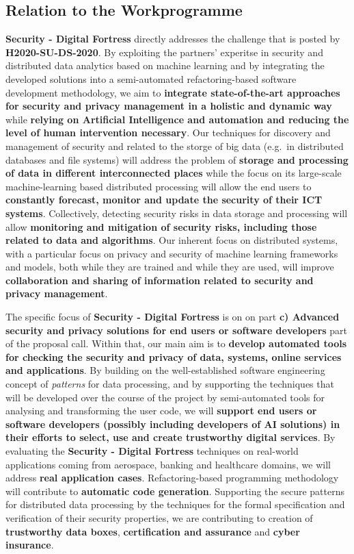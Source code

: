 \documentclass[a4paper,11pt]{article}
\newcommand{\project}[1]{\textbf{#1}\xspace}
\newcommand{\SECURITY}{\project{Security - Digital Fortress}}
\newcommand{\TheProject}{\SECURITY}
\begin{document}
\pagebreak
\subsection{Relation to the Workprogramme}

\TheProject{} directly addresses the challenge that is posted by \textbf{H2020-SU-DS-2020}. By exploiting the partners' experitse in security and distributed data analytics based on machine learning and by integrating the developed solutions into a semi-automated refactoring-based software development methodology, we aim to \textbf{integrate state-of-the-art approaches for security and privacy management in a holistic and dynamic way} while \textbf{relying on Artificial Intelligence and automation and reducing the level of human intervention necessary}. Our techniques for discovery and management of security and related to the storge of big data (e.g.~in distributed databases and file systems) will address the problem of \textbf{storage and processing of data in different interconnected places} while the focus on its large-scale machine-learning based distributed processing will allow the end users to \textbf{constantly forecast, monitor and update the security of their ICT systems}. Collectively, detecting security risks in data storage and processing will allow \textbf{monitoring and mitigation of security risks, including those related to data and algorithms}. Our inherent focus on distributed systems, with a particular focus on privacy and security of machine learning frameworks and models, both while they are trained and while they are used, will improve \textbf{collaboration and sharing of information related to security and privacy management}. 

The specific focus of \TheProject{} is on on part \textbf{c) Advanced security and privacy solutions for end users or software developers} part of the proposal call. Within that, our main aim is to \textbf{develop automated tools for checking the security and privacy of data, systems, online services and applications}. By building on the well-established software engineering concept of \emph{patterns} for data processing, and by supporting the techniques that will be developed over the course of the project by semi-automated tools for analysing and transforming the user code, we will \textbf{support end users or software developers (possibly including developers of AI solutions) in their efforts to select, use and create trustworthy digital services}. By evaluating the \TheProject{} techniques on real-world applications coming from aerospace, banking and healthcare domains, we will address \textbf{real application cases}. Refactoring-based programming methodology will contribute to \textbf{automatic code generation}. Supporting the secure patterns for distributed data processing by the techniques for the formal specification and verification of their security properties, we are contributing to creation of \textbf{trustworthy data boxes}, \textbf{certification and assurance} and \textbf{cyber insurance}.
\end{document}
